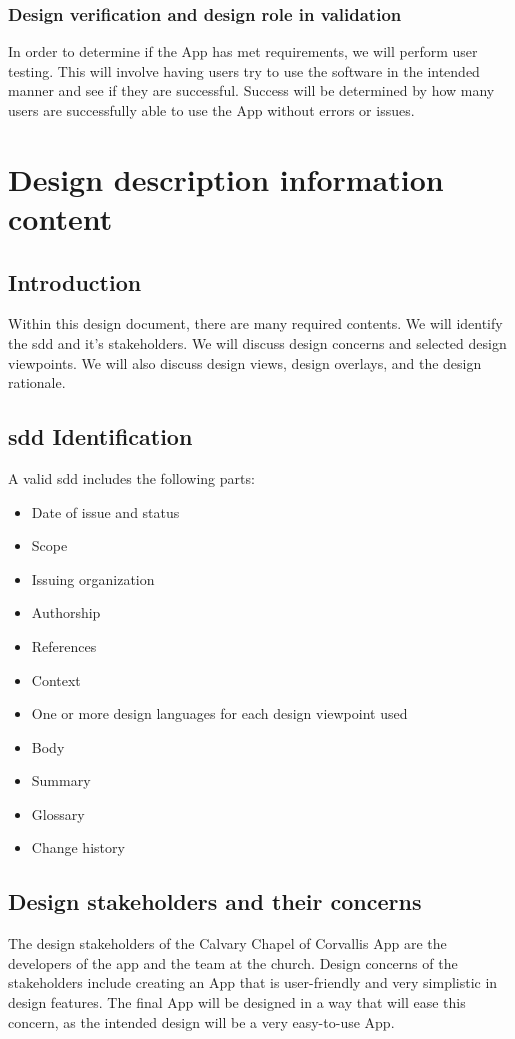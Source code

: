 \documentclass[letterpaper,10pt,draftclsnofoot,onecolumn,titlepage]{IEEEtran}
\begin{document}
			\subsubsection{Design verification and design role in validation}
				In order to determine if the \gls{App} has met requirements, we will perform user testing.
				This will involve having users try to use the software in the intended manner and see if they are successful.
				Success will be determined by how many users are successfully able to use the \gls{App} without errors or issues.

	\section{Design description information content}

		\subsection{Introduction}
			Within this design document, there are many required contents.
			We will identify the \gls{sdd} and it's stakeholders.
			We will discuss design concerns and selected design viewpoints.
			We will also discuss design views, design overlays, and the design rationale.

		\subsection{\gls{sdd} Identification}
			A valid \gls{sdd} includes the following parts:
			\begin{itemize}
				\item{Date of issue and status}
				\item{Scope}
				\item{Issuing organization}
				\item{Authorship}
				\item{References}
				\item{Context}
				\item{One or more design languages for each design viewpoint used}
				\item{Body}
				\item{Summary}
				\item{Glossary}
				\item{Change history}
			\end{itemize}

		\subsection{Design stakeholders and their concerns}
			The design stakeholders of the Calvary Chapel of Corvallis \gls{App} are the developers of the app and the team at the church.
			Design concerns of the stakeholders include creating an \gls{App} that is user-friendly and very simplistic in design features.
			The final \gls{App} will be designed in a way that will ease this concern, as the intended design will be a very easy-to-use \gls{App}.
\end{document}
